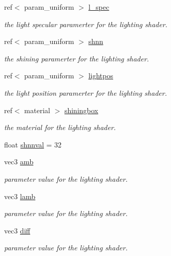 \begin{DoxyCompactItemize}
ref$<$ param\+\_\+uniform $>$ \hyperlink{classoctet_1_1minecraft__wars_a6ef89c983e9b97bb1569a6962cb5417f}{l\+\_\+spec}
\begin{DoxyCompactList}\small\item\em the light specular paramerter for the lighting shader. \end{DoxyCompactList}\item 
ref$<$ param\+\_\+uniform $>$ \hyperlink{classoctet_1_1minecraft__wars_ae1bffb6f992f549b9f5664b9c81e114b}{shnn}
\begin{DoxyCompactList}\small\item\em the shining paramerter for the lighting shader. \end{DoxyCompactList}\item 
ref$<$ param\+\_\+uniform $>$ \hyperlink{classoctet_1_1minecraft__wars_aec22f87413969e6f3f86775d38e82ab3}{lightpos}
\begin{DoxyCompactList}\small\item\em the light position paramerter for the lighting shader. \end{DoxyCompactList}\item 
ref$<$ material $>$ \hyperlink{classoctet_1_1minecraft__wars_a13bdb9153c1d5fd497f5c0b7503d28d3}{shiningbox}
\begin{DoxyCompactList}\small\item\em the material for the lighting shader. \end{DoxyCompactList}\item 
float \hyperlink{classoctet_1_1minecraft__wars_a787dde65a444e4e71eb3994ced4a1f46}{shnnval} = 32
\item 
vec3 \hyperlink{classoctet_1_1minecraft__wars_acfbc3cf4a5d70d3885b38c220c2151ad}{amb}
\begin{DoxyCompactList}\small\item\em parameter value for the lighting shader. \end{DoxyCompactList}\item 
vec3 \hyperlink{classoctet_1_1minecraft__wars_a6b8b4cc7893ab6f361694de9d26d6336}{lamb}
\begin{DoxyCompactList}\small\item\em parameter value for the lighting shader. \end{DoxyCompactList}\item 
vec3 \hyperlink{classoctet_1_1minecraft__wars_affef81405c5dad0bc10c409781719645}{diff}
\begin{DoxyCompactList}\small\item\em parameter value for the lighting shader. \end{DoxyCompactList}\item 

\end{DoxyCompactItemize}
